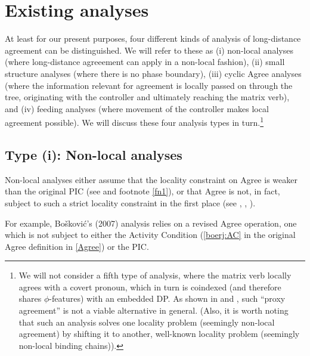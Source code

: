 \documentclass[output=paper
,modfonts
,nonflat]{langsci/langscibook}
\begin{document}
	
	\section{Existing analyses} \label{sec-bjoe-muel:2}
	
	At least for our present purposes, four different kinds of analysis
	of long-distance agreement can be distinguished. We will refer to
	these as (i) non-local analyses (where long-distance agreeement can
	apply in a non-local fashion),  (ii) small structure analyses (where
	there is no phase boundary), (iii) cyclic Agree analyses (where the
	information relevant for agreement is locally passed on through the
	tree, originating with the controller and ultimately reaching the
	matrix verb), and (iv) feeding analyses (where movement
	of the controller makes 
	local agreement possible). We will discuss these four analysis types in
	turn.\footnote{We will not consider a fifth type of analysis, where
		the matrix verb locally agrees with a covert pronoun, which in turn
		is coindexed (and therefore shares $\phi$-features) with an
		embedded DP. As shown in \citet{PolinskyPotsdam:01} and
		\citet{BhattKeine:16:lon}, such ``proxy agreement'' is not a viable
		alternative in general. (Also, it is worth noting that such an
		analysis solves one locality problem (seemingly non-local agreement)
		by shifting it to another, well-known locality problem (seemingly
		non-local binding chains)).}
	
	\subsection{Type (i): Non-local analyses}
	
	Non-local analyses either assume that the locality constraint on Agree
	is weaker than the original PIC (see \citealt{Chomsky:01} and footnote
	\ref{fn1}), or that Agree is not, in fact, subject to such a strict
	locality constraint in the first place (see \citealt{Sells:06}, \citealt{Boskovic:07},
	\citealt{Keine:16}).
	
	For example, Bo\v{s}kovi{\'c}'s (2007) analysis relies on a revised
	Agree operation, one which is not subject to either the  Activity
	Condition (\ref{boerj:AC} in the original Agree definition in
	\ref{Agree}) or the PIC. 
	
\end{document}
